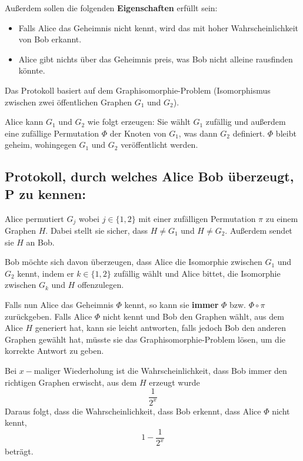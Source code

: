 \documentclass{scrartcl}%
\begin{document}
    Außerdem sollen die folgenden \textbf{\textsf{Eigenschaften}} erfüllt sein:

    \begin{itemize}
        \item Falls Alice das Geheimnis nicht kennt, wird das mit hoher Wahrscheinlichkeit von Bob erkannt.
        \item Alice gibt nichts über das Geheimnis preis, was Bob nicht alleine rausfinden könnte.
    \end{itemize}

    Das Protokoll basiert auf dem Graphisomorphie-Problem (Isomorphismus zwischen zwei öffentlichen Graphen $G_1$ und $G_2$).

    Alice kann $G_1$ und $G_2$ wie folgt erzeugen: Sie wählt $G_1$ zufällig und außerdem eine zufällige Permutation $\Phi$ der Knoten von $G_1$, was dann $G_2$ definiert.
    $\Phi$ bleibt geheim, wohingegen $G_1$ und $G_2$ veröffentlicht werden.
    \newline
    \newline
    \subsection*{Protokoll, durch welches Alice Bob überzeugt, P zu kennen:}
    \newline
    \newline
    Alice permutiert $G_{j}$ wobei $j \in \{1,2\}$ mit einer zufälligen Permutation $\pi$ zu einem Graphen $H$.
    Dabei stellt sie sicher, dass $H\neq G_1$ und $H\neq G_2$.
    Außerdem sendet sie $H$ an Bob.

    Bob möchte sich davon überzeugen, dass Alice die Isomorphie zwischen $G_1$ und $G_2$ kennt,
    indem er $k \in \{1,2\}$ zufällig wählt und Alice bittet, die Isomorphie zwischen $G_k$ und $H$ offenzulegen.

    Falls nun Alice das Geheimnis $\Phi$ kennt, so kann sie \textbf{\textsf{immer}} $\Phi$ bzw. $\Phi \circ \pi$ zurückgeben.
    Falls Alice $\Phi$ nicht kennt und Bob den Graphen wählt, aus dem Alice $H$ generiert hat,
    kann sie leicht antworten, falls jedoch Bob den anderen Graphen gewählt hat,
    müsste sie das Graphisomorphie-Problem lösen, um die korrekte Antwort zu geben.

    Bei $x-$maliger Wiederholung ist die Wahrscheinlichkeit, dass Bob immer den richtigen Graphen erwischt, aus dem $H$ erzeugt wurde
    \begin{equation*}
        \frac{1}{2^x}
    \end{equation*}
    Daraus folgt, dass die Wahrscheinlichkeit, dass Bob erkennt, dass Alice $\Phi$ nicht kennt,
    \begin{equation*}
        1-\frac{1}{2^x}
    \end{equation*}
    beträgt.
\end{document}
